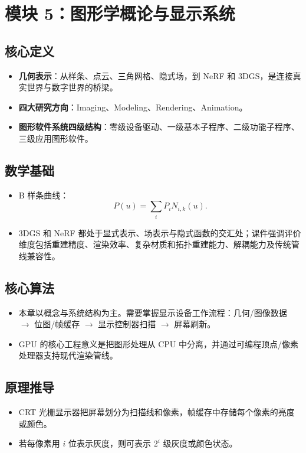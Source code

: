 \documentclass[UTF8,zihao=-4,scheme=chinese,fontset=fandol]{ctexart}
\newcommand{\key}[1]{\textbf{#1}}
\begin{document}
\section{模块 5：图形学概论与显示系统}

\subsection{核心定义}
\begin{itemize}
  \item \key{几何表示}：从样条、点云、三角网格、隐式场，到 NeRF 和 3DGS，是连接真实世界与数字世界的桥梁。
  \item \key{四大研究方向}：Imaging、Modeling、Rendering、Animation。
  \item \key{图形软件系统四级结构}：零级设备驱动、一级基本子程序、二级功能子程序、三级应用图形软件。
\end{itemize}

\subsection{数学基础}
\begin{itemize}
  \item B 样条曲线：
  \[
  P(u)=\sum_iP_iN_{i,k}(u).
  \]
  \item 3DGS 和 NeRF 都处于显式表示、场表示与隐式函数的交汇处；课件强调评价维度包括重建精度、渲染效率、复杂材质和拓扑重建能力、解耦能力及传统管线兼容性。
\end{itemize}

\subsection{核心算法}
\begin{itemize}
  \item 本章以概念与系统结构为主。需要掌握显示设备工作流程：几何/图像数据 $\rightarrow$ 位图/帧缓存 $\rightarrow$ 显示控制器扫描 $\rightarrow$ 屏幕刷新。
  \item GPU 的核心工程意义是把图形处理从 CPU 中分离，并通过可编程顶点/像素处理器支持现代渲染管线。
\end{itemize}

\subsection{原理推导}
\begin{itemize}
  \item CRT 光栅显示器把屏幕划分为扫描线和像素，帧缓存中存储每个像素的亮度或颜色。
  \item 若每像素用 $i$ 位表示灰度，则可表示 $2^i$ 级灰度或颜色状态。
\end{itemize}
\end{document}
